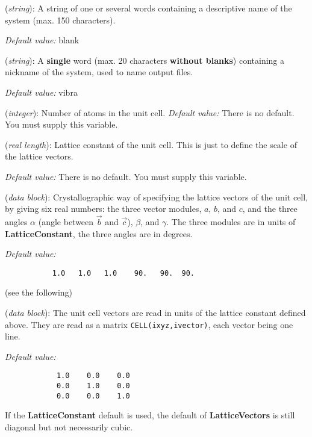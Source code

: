 \vspace{5pt}

\begin{description}
\itemsep 10pt
\parsep 0pt

\item[{\bf SystemName}] ({\it string}): 
A string of one or several words containing a descriptive
name of the system (max. 150 characters). 

{\it Default value:} blank

\item[{\bf SystemLabel}] ({\it string}): 
A {\bf single} word (max. 20 characters {\bf without blanks})
containing a nickname of the system, used to name output files.

{\it Default value:} vibra

\item[{\bf NumberOfAtoms}] ({\it integer}):
 Number of atoms in the unit cell.
{\it Default value:} There is no default. You must supply this variable.



\item[{\bf LatticeConstant}] ({\it real length}): Lattice constant
of the unit cell.
This is just to define the scale of the lattice vectors.

{\it Default value:} There is no default. You must supply this variable.

\item[{\bf LatticeParameters}] ({\it data block}):
Crystallographic way of specifying the lattice vectors
of the unit cell, by giving
six real numbers: the three vector modules, $a$, $b$, and $c$, and
the three angles $\alpha$ (angle between $\vec b$ and $\vec c$),
$\beta$, and $\gamma$. The three modules are in units of 
{\bf LatticeConstant}, the three angles are in degrees.

{\it Default value:}
\begin{verbatim}
           1.0   1.0   1.0    90.   90.  90.
\end{verbatim}
\noindent
(see the following)

\item[{\bf LatticeVectors}] ({\it data block}): 
The unit cell vectors are read 
in units of the lattice constant defined above. 
They are read as a matrix {\tt CELL(ixyz,ivector)}, each vector being
one line.

{\it Default value:} 
\begin{verbatim}
            1.0    0.0    0.0 
            0.0    1.0    0.0 
            0.0    0.0    1.0 
\end{verbatim}
\noindent
If the {\bf LatticeConstant} default is used, the default of 
{\bf LatticeVectors} is still diagonal but not necessarily cubic.



\end{description}
